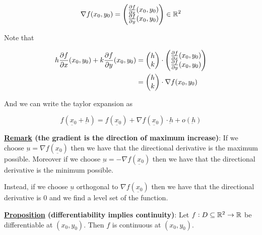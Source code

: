 \documentclass[10pt]{extarticle}
\renewcommand{\vec}[1]{\underbar{\ensuremath{#1}}}
\begin{document}
$$
    \nabla f(x_0, y_0) = \begin{pmatrix}
        \pdv{f}{x}()(x_0, y_0) \\ \pdv{f}{y}()(x_0, y_0)
    \end{pmatrix} \in \mathbb{R}^2
$$

Note that

\begin{align*}
    h \pdv{f}{x}()(x_0, y_0) + k \pdv{f}{y}()(x_0, y_0) & = \begin{pmatrix}
                                                                h \\ k
                                                            \end{pmatrix} \cdot \begin{pmatrix}
                                                                                    \pdv{f}{x}()(x_0, y_0) \\ \pdv{f}{y}()(x_0, y_0)
                                                                                \end{pmatrix} \\
                                                        & = \begin{pmatrix}
                                                                h \\ k
                                                            \end{pmatrix} \cdot \nabla f(x_0, y_0)
\end{align*}

And we can write the taylor expansion as

$$
    f(\vec{x_0} + \vec{h}) = f(\vec{x_0}) + \nabla f(\vec{x_0}) \cdot \vec{h} + o(\vec{h})
$$

\textbf{\underline{Remark} (the gradient is the direction of maximum increase)}:
If we choose $\vec{u} = \nabla f(\vec{x_0})$ then we have that the directional derivative is the maximum possible.
Moreover if we choose $\vec{u} = -\nabla f(\vec{x_0})$ then we have that the directional derivative is the minimum possible.

Instead, if we choose $\vec{u}$ orthogonal to $\nabla f(\vec{x_0})$ then we have that the directional derivative is 0 and we find a level set of the function.

\textbf{\underline{Proposition} (differentiability implies continuity)}:
Let $f: D \subseteq \mathbb{R}^2 \to \mathbb{R}$ be differentiable at $(x_0, y_0)$.
Then $f$ is continuous at $(x_0, y_0)$.
\end{document}
